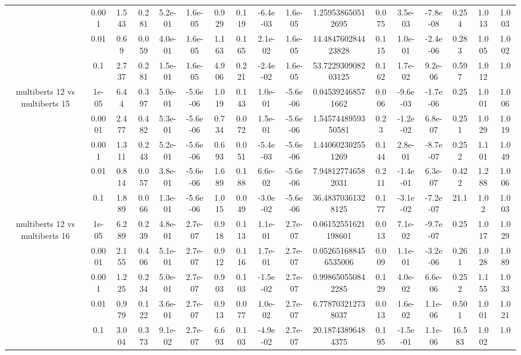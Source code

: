 \begin{tabular}{|c|c|c|c|c|c|c|c|c|c|c|c|c|c|c|c|c|}
 & 0.001 & 1.543 & 0.281 & 5.2e-01 & 1.6e-05 & 0.929 & 0.119 & -6.4e-03 & 1.6e-05 & 1.259538650512695 & 0.075 & 3.5e-03 & -7.8e-08 & 0.254 & 1.013 & 1.003 \\
 & 0.01 & 0.69 & 0.059 & 4.0e-01 & 1.6e-05 & 1.163 & 0.165 & 2.1e-02 & 1.6e-05 & 14.484760284423828 & 0.115 & 1.0e-01 & -2.4e-06 & 0.283 & 1.005 & 1.002 \\
 & 0.1 & 2.737 & 0.281 & 1.5e-01 & 1.6e-05 & 4.906 & 0.221 & -2.4e-02 & 1.6e-05 & 53.722930908203125 & 0.162 & 1.7e-02 & 9.2e-06 & 0.597 & 1.012 & 1.0 \\
\hline
\multirow{5}{*}{multiberts 12 vs multiberts 15} & 1e-05 & 6.44 & 0.397 & 5.0e-01 & -5.6e-06 & 1.019 & 0.143 & 1.0e-01 & -5.6e-06 & 0.045392468571662 & 0.006 & -9.6e-03 & -1.7e-06 & 0.25 & 1.001 & 1.006 \\
 & 0.0001 & 2.477 & 0.482 & 5.3e-01 & -5.6e-06 & 0.734 & 0.072 & 1.5e-01 & -5.6e-06 & 1.5457448959350581 & 0.23 & -1.2e-02 & 6.8e-07 & 0.251 & 1.029 & 1.019 \\
 & 0.001 & 1.311 & 0.243 & 5.2e-01 & -5.6e-06 & 0.693 & 0.051 & -5.4e-03 & -5.6e-06 & 1.440602302551269 & 0.144 & 2.8e-01 & -8.7e-07 & 0.252 & 1.101 & 1.049 \\
 & 0.01 & 0.814 & 0.057 & 3.8e-01 & -5.6e-06 & 1.689 & 0.188 & 6.6e-02 & -5.6e-06 & 7.948127746582031 & 0.211 & -1.4e-01 & 6.3e-07 & 0.422 & 1.288 & 1.006 \\
 & 0.1 & 1.889 & 0.066 & 1.3e-01 & -5.6e-06 & 1.015 & 0.049 & -3.0e-02 & -5.6e-06 & 36.48370361328125 & 0.177 & -3.1e-02 & -7.2e-07 & 21.1 & 1.02 & 1.003 \\
\hline
\multirow{5}{*}{multiberts 12 vs multiberts 16} & 1e-05 & 6.289 & 0.239 & 4.8e-01 & 2.7e-07 & 0.918 & 0.113 & 1.1e-01 & 2.7e-07 & 0.06152551621198601 & 0.013 & 7.1e-02 & -9.7e-07 & 0.25 & 1.017 & 1.029 \\
 & 0.0001 & 2.155 & 0.406 & 5.1e-01 & 2.7e-07 & 0.912 & 0.116 & 1.7e-01 & 2.7e-07 & 0.052651688456535006 & 0.009 & 1.1e-01 & -3.2e-06 & 0.261 & 1.028 & 1.089 \\
 & 0.001 & 1.225 & 0.234 & 5.0e-01 & 2.7e-07 & 0.903 & 0.103 & -1.5e-02 & 2.7e-07 & 0.998650550842285 & 0.129 & 4.0e-02 & 6.6e-06 & 0.252 & 1.155 & 1.033 \\
 & 0.01 & 0.979 & 0.122 & 3.6e-01 & 2.7e-07 & 0.913 & 0.077 & 1.0e-02 & 2.7e-07 & 6.778703212738037 & 0.013 & 1.6e-02 & 1.1e-06 & 0.501 & 1.001 & 1.021 \\
 & 0.1 & 3.004 & 0.373 & 9.1e-02 & 2.7e-07 & 6.693 & 0.103 & -4.9e-02 & 2.7e-07 & 20.18743896484375 & 0.195 & -1.5e-01 & 1.1e-06 & 16.583 & 1.002 & 1.0 \\

\end{tabular}
